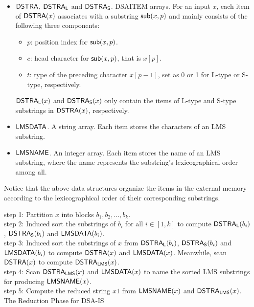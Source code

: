 \documentclass[10pt,journal,compsoc]{IEEEtran}
\begin{document}
\begin{itemize}[itemindent = 0ex]
	
	\item ${\sf DSTRA}$, ${\sf DSTRA_L}$ and ${\sf DSTRA_S}$. DSAITEM arrays. For an input $x$, each item of ${\sf DSTRA}(x)$ associates with a substring ${\sf sub}(x, p)$ and mainly consists of the following three components:
	\begin{itemize}[itemindent = 0ex]
		\item $p$: position index for ${\sf sub}(x, p)$.
		\item $c$: head character for ${\sf sub}(x, p)$, that is $x[p]$.
		\item $t$: type of the preceding character $x[p - 1]$, set as 0 or 1 for L-type or S-type, respectively.
	\end{itemize}
	
	${\sf DSTRA_L}(x)$ and ${\sf DSTRA_S}(x)$ only contain the items of L-type and S-type substrings in ${\sf DSTRA}(x)$, respectively.
	
	\item ${\sf LMSDATA}$. A string array. Each item stores the characters of an LMS substring.
	
	\item ${\sf LMSNAME}$. An integer array. Each item stores the name of an LMS substring, where the name represents the substring's lexicographical order among all.
	
\end{itemize}

Notice that the above data structures organize the items in the external memory according to the lexicographical order of their corresponding substrings.

\begin{algorithm}
	\SetAlgoNoLine
	
	step 1: Partition $x$ into blocks $b_1, b_2, ..., b_k$.~\label{alg:dsais_reduction_phase:1} \\
	step 2: Induced sort the substrings of $b_i$ for all $i \in [1, k]$ to compute ${\sf DSTRA_L}(b_i)$, ${\sf DSTRA_S}(b_i)$ and ${\sf LMSDATA}(b_i)$. ~\label{alg:dsais_reduction_phase:2}\\
	step 3: Induced sort the substrings of $x$ from ${\sf DSTRA_L}(b_i)$, ${\sf DSTRA_S}(b_i)$ and ${\sf LMSDATA}(b_i)$ to compute ${\sf DSTRA}(x)$ and ${\sf LMSDATA}(x)$. Meanwhile, scan ${\sf DSTRA}(x)$ to compute ${\sf DSTRA_{LMS}}(x)$.~\label{alg:dsais_reduction_phase:3}\\
	step 4: Scan ${\sf DSTRA_{LMS}}(x)$ and ${\sf LMSDATA}(x)$ to name the sorted LMS substrings for producing ${\sf LMSNAME}(x)$. ~\label{alg:dsais_reduction_phase:4}\\
	step 5: Compute the reduced string $x1$ from ${\sf LMSNAME}(x)$ and ${\sf DSTRA_{LMS}}(x)$. ~\label{alg:dsais_reduction_phase:5}\\
	
	\caption{The Reduction Phase for DSA-IS}
	\label{alg:dsais_reduction_phase}
\end{algorithm}
\end{document}
